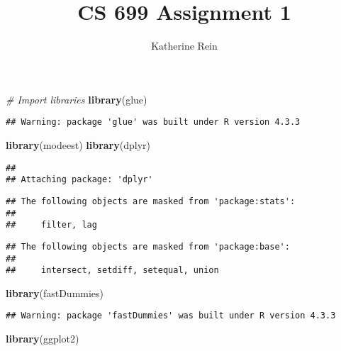 \documentclass[
]{article}
\title{CS 699 Assignment 1}
\author{Katherine Rein}
\date{}
\newenvironment{Shaded}{\begin{snugshade}}{\end{snugshade}}
\newcommand{\CommentTok}[1]{\textcolor[rgb]{0.56,0.35,0.01}{\textit{#1}}}
\newcommand{\FunctionTok}[1]{\textcolor[rgb]{0.13,0.29,0.53}{\textbf{#1}}}
\newcommand{\NormalTok}[1]{#1}
\begin{document}
\maketitle

\begin{Shaded}
\begin{Highlighting}[]
\CommentTok{\# Import libraries}
\FunctionTok{library}\NormalTok{(glue)}
\end{Highlighting}
\end{Shaded}

\begin{verbatim}
## Warning: package 'glue' was built under R version 4.3.3
\end{verbatim}

\begin{Shaded}
\begin{Highlighting}[]
\FunctionTok{library}\NormalTok{(modeest)}
\FunctionTok{library}\NormalTok{(dplyr)}
\end{Highlighting}
\end{Shaded}

\begin{verbatim}
## 
## Attaching package: 'dplyr'
\end{verbatim}

\begin{verbatim}
## The following objects are masked from 'package:stats':
## 
##     filter, lag
\end{verbatim}

\begin{verbatim}
## The following objects are masked from 'package:base':
## 
##     intersect, setdiff, setequal, union
\end{verbatim}

\begin{Shaded}
\begin{Highlighting}[]
\FunctionTok{library}\NormalTok{(fastDummies)}
\end{Highlighting}
\end{Shaded}

\begin{verbatim}
## Warning: package 'fastDummies' was built under R version 4.3.3
\end{verbatim}

\begin{Shaded}
\begin{Highlighting}[]
\FunctionTok{library}\NormalTok{(ggplot2)}
\end{Highlighting}
\end{Shaded}
\end{document}
